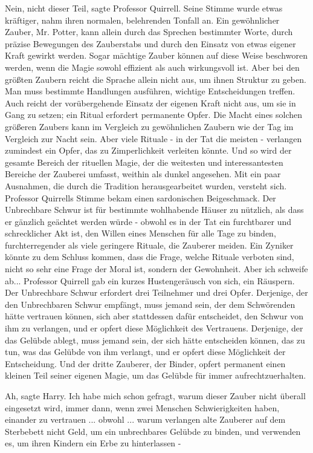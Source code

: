 \glqq Nein, nicht dieser Teil\grqq{}, sagte Professor Quirrell. Seine Stimme
wurde etwas kräftiger, nahm ihren normalen, belehrenden Tonfall an. \glqq Ein
gewöhnlicher Zauber, Mr. Potter, kann allein durch das Sprechen bestimmter
Worte, durch präzise Bewegungen des Zauberstabs und durch den Einsatz von etwas
eigener Kraft gewirkt werden. Sogar mächtige Zauber können auf diese Weise
beschworen werden, wenn die Magie sowohl effizient als auch wirkungsvoll ist.
Aber bei den größten Zaubern reicht die Sprache allein nicht aus, um ihnen
Struktur zu geben. Man muss bestimmte Handlungen ausführen, wichtige
Entscheidungen treffen. Auch reicht der vorübergehende Einsatz der eigenen Kraft
nicht aus, um sie in Gang zu setzen; ein Ritual erfordert permanente Opfer. Die
Macht eines solchen größeren Zaubers kann im Vergleich zu gewöhnlichen Zaubern
wie der Tag im Vergleich zur Nacht sein. Aber viele Rituale - in der Tat die
meisten - verlangen zumindest ein Opfer, das zu Zimperlichkeit verleiten könnte.
Und so wird der gesamte Bereich der rituellen Magie, der die weitesten und
interessantesten Bereiche der Zauberei umfasst, weithin als dunkel angesehen.
Mit ein paar Ausnahmen, die durch die Tradition herausgearbeitet wurden,
versteht sich.\grqq{} Professor Quirrells Stimme bekam einen sardonischen
Beigeschmack. \glqq Der Unbrechbare Schwur ist für bestimmte wohlhabende Häuser
zu nützlich, als dass er gänzlich geächtet werden würde - obwohl es in der Tat
ein furchtbarer und schrecklicher Akt ist, den Willen eines Menschen für alle
Tage zu binden, furchterregender als viele geringere Rituale, die Zauberer
meiden. Ein Zyniker könnte zu dem Schluss kommen, dass die Frage, welche Rituale
verboten sind, nicht so sehr eine Frage der Moral ist, sondern der Gewohnheit.
Aber ich schweife ab...\grqq{} Professor Quirrell gab ein kurzes Hustengeräusch
von sich, ein Räuspern. \glqq Der Unbrechbare Schwur erfordert drei Teilnehmer
und drei Opfer. Derjenige, der den Unbrechbaren Schwur empfängt, muss jemand
sein, der dem Schwörenden hätte vertrauen können, sich aber stattdessen dafür
entscheidet, den Schwur von ihm zu verlangen, und er opfert diese Möglichkeit
des Vertrauens. Derjenige, der das Gelübde ablegt, muss jemand sein, der sich
hätte entscheiden können, das zu tun, was das Gelübde von ihm verlangt, und er
opfert diese Möglichkeit der Entscheidung. Und der dritte Zauberer, der Binder,
opfert permanent einen kleinen Teil seiner eigenen Magie, um das Gelübde für
immer aufrechtzuerhalten.\grqq{}

\glqq Ah\grqq{}, sagte Harry. \glqq Ich habe mich schon gefragt, warum dieser
Zauber nicht überall eingesetzt wird, immer dann, wenn zwei Menschen
Schwierigkeiten haben, einander zu vertrauen ... obwohl ... warum verlangen alte
Zauberer auf dem Sterbebett nicht Geld, um ein unbrechbares Gelübde zu binden,
und verwenden es, um ihren Kindern ein Erbe zu hinterlassen -\grqq{}

